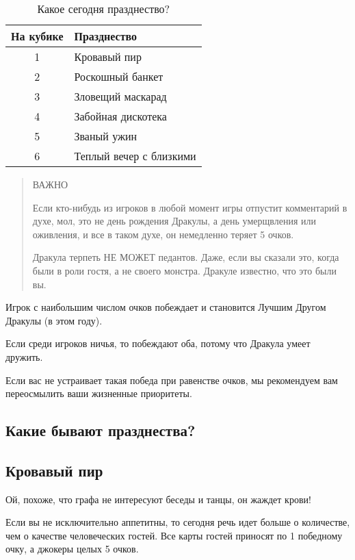 \documentclass[twoside,twocolumn]{article}
\begin{document}
\begin{table}
\caption{Какое сегодня празднество?}
\centering
\begin{tabular}{cl}
\toprule
\cmidrule(r){1-2}
На кубике & Празднество \\
\midrule
1 & Кровавый пир \\
2 & Роскошный банкет \\
3 & Зловещий маскарад \\
4 & Забойная дискотека \\
5 & Званый ужин \\
6 & Теплый вечер с близкими \\
\bottomrule
\end{tabular}
\end{table}

\begin{quote}
ВАЖНО

Если кто-нибудь из игроков в любой момент игры отпустит комментарий в духе, мол, это не день рождения Дракулы, а день умерщвления или оживления, и все в таком духе, он немедленно теряет 5 очков.

Дракула терпеть НЕ МОЖЕТ педантов.
Даже, если вы сказали это, когда были в роли гостя, а не своего монстра.
Дракуле известно, что это были вы.

\end{quote}

Игрок с наибольшим числом очков побеждает и становится Лучшим Другом Дракулы (в этом году).

Если среди игроков ничья, то побеждают оба, потому что Дракула умеет дружить.

Если вас не устраивает такая победа при равенстве очков, мы рекомендуем вам переосмылить ваши жизненные приоритеты.

\subsection*{Какие бывают празднества?}
\subsection{Кровавый пир}
Ой, похоже, что графа не интересуют беседы и танцы, он жаждет крови!

Если вы не исключительно аппетитны, то сегодня речь идет больше о количестве, чем о качестве человеческих гостей. Все карты гостей приносят по 1 победному очку, а джокеры целых 5 очков.
\end{document}
